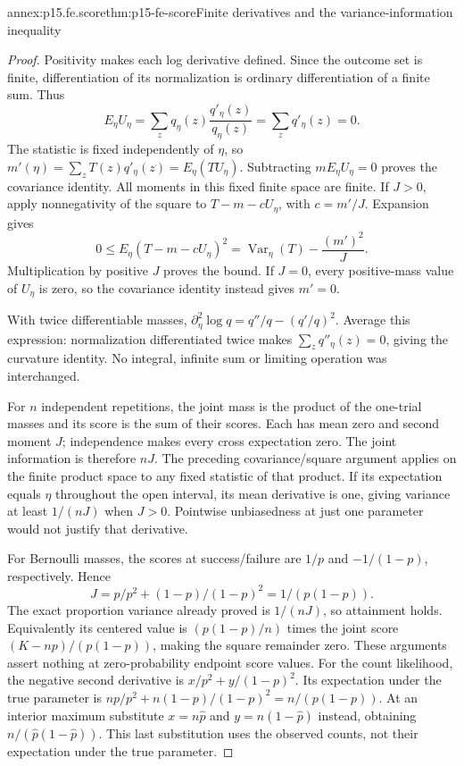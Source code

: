 \begin{annexitem}{annex:p15.fe.score}{thm:p15-fe-score}{Finite derivatives and the variance-information inequality}
\begin{proof}
Positivity makes each log derivative defined. Since the outcome set is
finite, differentiation of its normalization is ordinary differentiation
of a finite sum. Thus
\[
 E_\eta U_\eta=\sum_z q_\eta(z)\frac{q'_\eta(z)}{q_\eta(z)}
              =\sum_zq'_\eta(z)=0.
\]
The statistic is fixed independently of \(\eta\), so
\(m'(\eta)=\sum_zT(z)q'_\eta(z)=E_\eta(TU_\eta)\).
Subtracting \(m E_\eta U_\eta=0\) proves the covariance identity.
All moments in this fixed finite space are finite.
If \(J>0\), apply nonnegativity of the square to
\(T-m-cU_\eta\), with \(c=m'/J\). Expansion gives
\[
 0\leq E_\eta(T-m-cU_\eta)^2
        =\operatorname{Var}_\eta(T)-\frac{(m')^2}{J}.
\]
Multiplication by positive \(J\) proves the bound.
If \(J=0\), every positive-mass value of \(U_\eta\) is zero,
so the covariance identity instead gives \(m'=0\).

With twice differentiable masses,
\(\partial_\eta^2\log q=q''/q-(q'/q)^2\).
Average this expression: normalization differentiated twice makes
\(\sum_zq''_\eta(z)=0\), giving the curvature identity.
No integral, infinite sum or limiting operation was interchanged.

For \(n\) independent repetitions, the joint mass is the product
of the one-trial masses and its score is the sum of their scores.
Each has mean zero and second moment \(J\); independence makes every
cross expectation zero. The joint information is therefore \(nJ\).
The preceding covariance/square argument applies on the finite product
space to any fixed statistic of that product. If its expectation equals
\(\eta\) throughout the open interval, its mean derivative is one,
giving variance at least \(1/(nJ)\) when \(J>0\).
Pointwise unbiasedness at just one parameter would not justify that
derivative.

For Bernoulli masses, the scores at success/failure are
\(1/p\) and \(-1/(1-p)\), respectively. Hence
\[
 J=p/p^2+(1-p)/(1-p)^2=1/(p(1-p)).
\]
The exact proportion variance already proved is \(1/(nJ)\), so
attainment holds. Equivalently its centered value is
\((p(1-p)/n)\) times the joint score
\((K-np)/(p(1-p))\), making the square remainder zero.
These arguments assert nothing at zero-probability endpoint score values.
For the count likelihood, the negative second derivative is
\(x/p^2+y/(1-p)^2\). Its expectation under the true parameter is
\(np/p^2+n(1-p)/(1-p)^2=n/(p(1-p))\).
At an interior maximum substitute \(x=n\widehat p\) and
\(y=n(1-\widehat p)\) instead, obtaining
\(n/(\widehat p(1-\widehat p))\). This last substitution uses
the observed counts, not their expectation under the true parameter.
\end{proof}
\end{annexitem}

